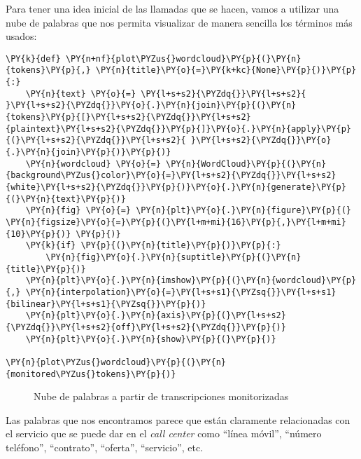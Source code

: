     Para tener una idea inicial de las llamadas que se hacen, vamos a utilizar 
una nube de palabras que nos permita visualizar de manera sencilla los
términos más usados:
\vspace{0.5cm}
    \begin{tcolorbox}[breakable, size=fbox, boxrule=1pt, pad at break*=1mm,colback=cellbackground, colframe=cellborder]
\begin{Verbatim}[commandchars=\\\{\}]
\PY{k}{def} \PY{n+nf}{plot\PYZus{}wordcloud}\PY{p}{(}\PY{n}{tokens}\PY{p}{,} \PY{n}{title}\PY{o}{=}\PY{k+kc}{None}\PY{p}{)}\PY{p}{:}
    \PY{n}{text} \PY{o}{=} \PY{l+s+s2}{\PYZdq{}}\PY{l+s+s2}{ }\PY{l+s+s2}{\PYZdq{}}\PY{o}{.}\PY{n}{join}\PY{p}{(}\PY{n}{tokens}\PY{p}{[}\PY{l+s+s2}{\PYZdq{}}\PY{l+s+s2}{plaintext}\PY{l+s+s2}{\PYZdq{}}\PY{p}{]}\PY{o}{.}\PY{n}{apply}\PY{p}{(}\PY{l+s+s2}{\PYZdq{}}\PY{l+s+s2}{ }\PY{l+s+s2}{\PYZdq{}}\PY{o}{.}\PY{n}{join}\PY{p}{)}\PY{p}{)}
    \PY{n}{wordcloud} \PY{o}{=} \PY{n}{WordCloud}\PY{p}{(}\PY{n}{background\PYZus{}color}\PY{o}{=}\PY{l+s+s2}{\PYZdq{}}\PY{l+s+s2}{white}\PY{l+s+s2}{\PYZdq{}}\PY{p}{)}\PY{o}{.}\PY{n}{generate}\PY{p}{(}\PY{n}{text}\PY{p}{)}
    \PY{n}{fig} \PY{o}{=} \PY{n}{plt}\PY{o}{.}\PY{n}{figure}\PY{p}{(} \PY{n}{figsize}\PY{o}{=}\PY{p}{(}\PY{l+m+mi}{16}\PY{p}{,}\PY{l+m+mi}{10}\PY{p}{)} \PY{p}{)}
    \PY{k}{if} \PY{p}{(}\PY{n}{title}\PY{p}{)}\PY{p}{:}
        \PY{n}{fig}\PY{o}{.}\PY{n}{suptitle}\PY{p}{(}\PY{n}{title}\PY{p}{)}
    \PY{n}{plt}\PY{o}{.}\PY{n}{imshow}\PY{p}{(}\PY{n}{wordcloud}\PY{p}{,} \PY{n}{interpolation}\PY{o}{=}\PY{l+s+s1}{\PYZsq{}}\PY{l+s+s1}{bilinear}\PY{l+s+s1}{\PYZsq{}}\PY{p}{)}
    \PY{n}{plt}\PY{o}{.}\PY{n}{axis}\PY{p}{(}\PY{l+s+s2}{\PYZdq{}}\PY{l+s+s2}{off}\PY{l+s+s2}{\PYZdq{}}\PY{p}{)}
    \PY{n}{plt}\PY{o}{.}\PY{n}{show}\PY{p}{(}\PY{p}{)}
    
\PY{n}{plot\PYZus{}wordcloud}\PY{p}{(}\PY{n}{monitored\PYZus{}tokens}\PY{p}{)}
\end{Verbatim}
\end{tcolorbox}

    
    
\begin{figure}[!ht]
	\centering
    \caption{Nube de palabras a partir de transcripciones monitorizadas}
    \label{fig:cloudmoni}
\end{figure}    
    
    Las palabras que nos encontramos parece que están claramente
relacionadas con el servicio que se puede dar en el \textit{call center} como
``línea móvil'', ``número teléfono'', ``contrato'', ``oferta'',
``servicio'', etc.


